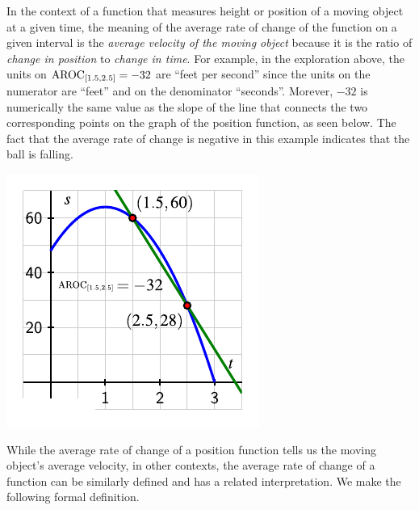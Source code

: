 \documentclass[nooutcomes]{ximera}
\begin{document}
In the context of a function that measures height or position of a moving object at a given time, the meaning of the average rate of change of the function on a given interval is the \emph{average velocity of the moving object} because it is the ratio of \emph{change in position} to \emph{change in time}.  For example, in the exploration above, the units on $\mathrm{AROC}_{[1.5,2.5]} = -32$ are ``feet per second'' since the units on the numerator are ``feet'' and on the denominator ``seconds''.  Morever, $-32$ is numerically the same value as the slope of the line that connects the two corresponding points on the graph of the position function, as seen below.  The fact that the average rate of change is negative in this example indicates that the ball is falling.

\begin{image}
\includegraphics{aroc-s-t-ex-1.pdf}
\end{image}

While the average rate of change of a position function tells us the moving object's average velocity, in other contexts, the average rate of change of a function can be similarly defined and has a related interpretation.  We make the following formal definition.
\end{document}
